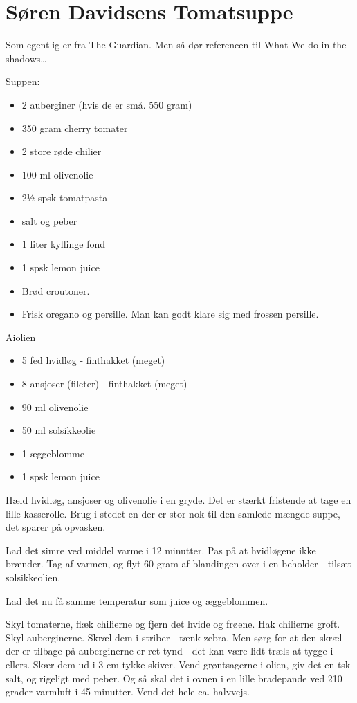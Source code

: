 \documentclass[
]{book}
\providecommand{\tightlist}{%
  \setlength{\itemsep}{0pt}\setlength{\parskip}{0pt}}
\begin{document}
\section{Søren Davidsens Tomatsuppe}\label{suxf8ren-davidsens-tomatsuppe}

Som egentlig er fra The Guardian.
Men så dør referencen til What We do in the shadows\ldots{}

Suppen:

\begin{itemize}
\tightlist
\item
  2 auberginer (hvis de er små. 550 gram)
\item
  350 gram cherry tomater
\item
  2 store røde chilier
\item
  100 ml olivenolie
\item
  2½ spsk tomatpasta
\item
  salt og peber
\item
  1 liter kyllinge fond
\item
  1 spsk lemon juice
\item
  Brød croutoner.
\item
  Frisk oregano og persille. Man kan godt klare sig med frossen persille.
\end{itemize}

Aiolien

\begin{itemize}
\tightlist
\item
  5 fed hvidløg - finthakket (meget)
\item
  8 ansjoser (fileter) - finthakket (meget)
\item
  90 ml olivenolie
\item
  50 ml solsikkeolie
\item
  1 æggeblomme
\item
  1 spsk lemon juice
\end{itemize}

Hæld hvidløg, ansjoser og olivenolie i en gryde. Det er stærkt fristende at tage
en lille kasserolle. Brug i stedet en der er stor nok til
den samlede mængde suppe, det sparer på opvasken.

Lad det simre ved middel varme i 12 minutter. Pas på at hvidløgene ikke brænder.
Tag af varmen, og flyt 60 gram af blandingen over i en beholder - tilsæt solsikkeolien.

Lad det nu få samme temperatur som juice og æggeblommen.

Skyl tomaterne, flæk chilierne og fjern det hvide og frøene. Hak chilierne
groft.
Skyl auberginerne. Skræl dem i striber - tænk zebra. Men sørg for at den skræl
der er tilbage på auberginerne er ret tynd - det kan være lidt træls at tygge i
ellers. Skær dem ud i 3 cm tykke skiver. Vend grøntsagerne i olien, giv det en
tsk salt, og rigeligt med peber. Og så skal det i ovnen i en lille bradepande
ved 210 grader varmluft i 45 minutter. Vend det hele ca. halvvejs.
\end{document}
